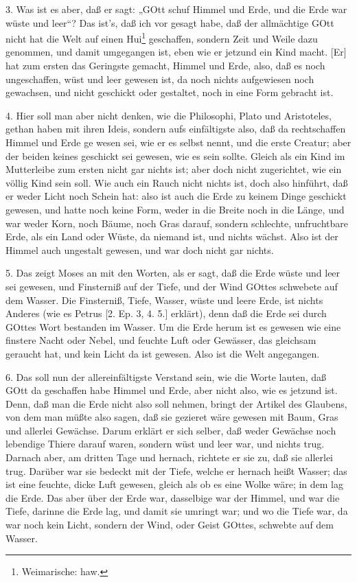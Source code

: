 3. Was ist es aber, daß er sagt: „GOtt schuf Himmel und Erde, und die Erde war wüste und leer“? Das ist’s, daß ich vor gesagt habe, daß der allmächtige GOtt nicht hat die Welt auf einen Hui\footnote{Weimarische: haw.} geschaffen, sondern Zeit und Weile dazu genommen, und damit umgegangen ist, eben wie er jetzund ein Kind macht. [Er] hat zum ersten das Geringste gemacht, Himmel und Erde, also, daß es noch ungeschaffen, wüst und leer gewesen ist, da noch nichts aufgewiesen noch gewachsen, und nicht geschickt oder gestaltet, noch in eine Form gebracht ist.

4. Hier soll man aber nicht denken, wie die Philosophi, Plato und Aristoteles, gethan haben mit ihren Ideis, sondern aufs einfältigste also, daß da rechtschaffen Himmel und Erde ge
wesen sei, wie er es selbst nennt, und die erste Creatur; aber der beiden keines geschickt sei gewesen, wie es sein sollte. Gleich als ein Kind im Mutterleibe zum ersten nicht gar nichts ist; aber doch nicht zugerichtet, wie ein völlig Kind sein soll. Wie auch ein Rauch nicht nichts ist, doch also hinführt, daß er weder Licht noch Schein hat: also ist auch die Erde zu keinem Dinge geschickt gewesen, und hatte noch keine Form, weder in die Breite noch in die Länge, und war weder Korn, noch Bäume, noch Gras darauf, sondern schlechte, unfruchtbare Erde, als ein Land oder Wüste, da niemand ist, und nichts wächst. Also ist der Himmel auch ungestalt gewesen, und war doch nicht gar nichts.

5. Das zeigt Moses an mit den Worten, als er sagt, daß die Erde wüste und leer sei gewesen, und Finsterniß auf der Tiefe, und der Wind GOttes schwebete auf dem Wasser. Die Finsterniß, Tiefe, Wasser, wüste und leere Erde, ist nichts Anderes (wie es Petrus [2. Ep. 3, 4. 5.] erklärt), denn daß die Erde sei durch GOttes Wort bestanden im Wasser. Um die Erde herum ist es gewesen wie eine finstere Nacht oder Nebel, und feuchte Luft oder Gewässer, das gleichsam geraucht hat, und kein Licht da ist gewesen. Also ist die Welt angegangen.

6. Das soll nun der allereinfältigste Verstand sein, wie die Worte lauten, daß GOtt da geschaffen habe Himmel und Erde, aber nicht also, wie es jetzund ist. Denn, daß man die Erde nicht also soll nehmen, bringt der Artikel des Glaubens, von dem man müßte also sagen, daß sie gezieret wäre gewesen mit Baum, Gras und allerlei Gewächse. Darum erklärt er sich selber, daß weder Gewächse noch lebendige Thiere darauf waren, sondern wüst und leer war, und nichts trug. Darnach aber, am dritten Tage und hernach, richtete er sie zu, daß sie allerlei trug. Darüber war sie bedeckt mit der Tiefe, welche er hernach heißt Wasser; das ist eine feuchte, dicke Luft gewesen, gleich als ob es eine Wolke wäre; in dem lag die Erde. Das aber über der Erde war, dasselbige war der Himmel, und war die Tiefe, darinne die Erde lag, und damit sie umringt war; und wo die Tiefe war, da war noch kein Licht, sondern der Wind, oder Geist GOttes, schwebte auf dem Wasser.

